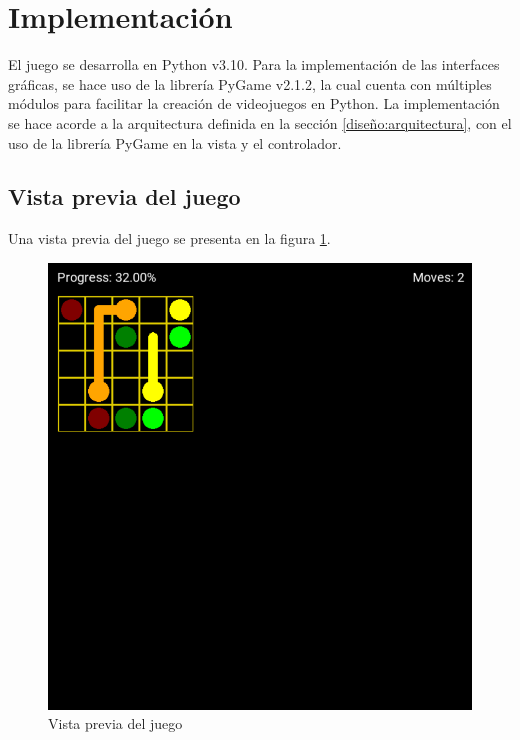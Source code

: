 \documentclass[letter,12pt]{article}
\begin{document}
\section{Implementación} \label{implementacion}

El juego se desarrolla en Python v3.10. Para la implementación de las interfaces gráficas, se hace uso de la librería PyGame v2.1.2, la cual cuenta con múltiples módulos para facilitar la creación de videojuegos en Python. La implementación se hace acorde a la arquitectura definida en la sección \ref{diseño:arquitectura}, con el uso de la librería PyGame en la vista y el controlador. \par

\subsection{Vista previa del juego} \label{implementacion:vista_previa}

Una vista previa del juego se presenta en la figura \ref{fig:vista_previa}. \par

\begin{figure}[ht!]
	\centering
	\includegraphics[scale=0.5]{img/game_preview.png}
	\caption{Vista previa del juego}
	\label{fig:vista_previa}
\end{figure}
\end{document}
